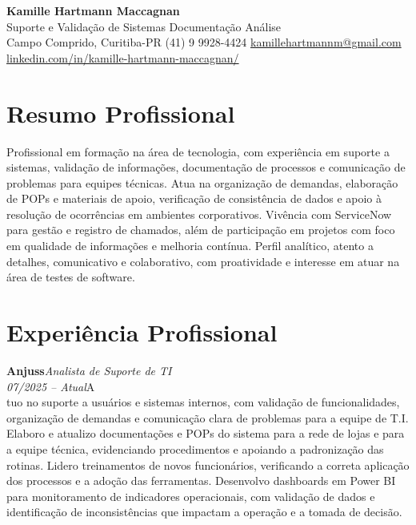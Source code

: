 \documentclass[11pt,a4paper]{article}
\newcommand{\cvrole}[4]{%
  \vspace{4pt}%
  {\bfseries\color{accentcolor}#1}\hfill{\itshape #2}\\[-2pt]%
  {\itshape #3}\hfill #4\\[6pt]%
}
\begin{document}
\begin{center}
  {\fontsize{20}{24}\selectfont\bfseries Kamille Hartmann Maccagnan}\\[8pt]
  {\large Suporte e Validação de Sistemas \textbar{} Documentação \textbar{} Análise}\\[10pt]
  Campo Comprido, Curitiba-PR \enspace\textbullet\enspace (41) 9 9928-4424 \enspace\textbullet\enspace
  \href{mailto:kamillehartmannm@gmail.com}{kamillehartmannm@gmail.com}\\[3pt]
  \href{https://linkedin.com/in/kamille-hartmann-maccagnan/}{linkedin.com/in/kamille-hartmann-maccagnan/}
\end{center}

\vspace{6pt}

\section{Resumo Profissional}

Profissional em formação na área de tecnologia, com experiência em suporte a sistemas, validação de informações, documentação de processos e comunicação de problemas para equipes técnicas. Atua na organização de demandas, elaboração de POPs e materiais de apoio, verificação de consistência de dados e apoio à resolução de ocorrências em ambientes corporativos. Vivência com ServiceNow para gestão e registro de chamados, além de participação em projetos com foco em qualidade de informações e melhoria contínua. Perfil analítico, atento a detalhes, comunicativo e colaborativo, com proatividade e interesse em atuar na área de testes de software.

\section{Experiência Profissional}

\cvrole{Anjuss}{Analista de Suporte de TI}{07/2025 -- Atual}

Atuo no suporte a usuários e sistemas internos, com validação de funcionalidades, organização de demandas e comunicação clara de problemas para a equipe de T.I. Elaboro e atualizo documentações e POPs do sistema para a rede de lojas e para a equipe técnica, evidenciando procedimentos e apoiando a padronização das rotinas. Lidero treinamentos de novos funcionários, verificando a correta aplicação dos processos e a adoção das ferramentas. Desenvolvo dashboards em Power BI para monitoramento de indicadores operacionais, com validação de dados e identificação de inconsistências que impactam a operação e a tomada de decisão.
\end{document}
